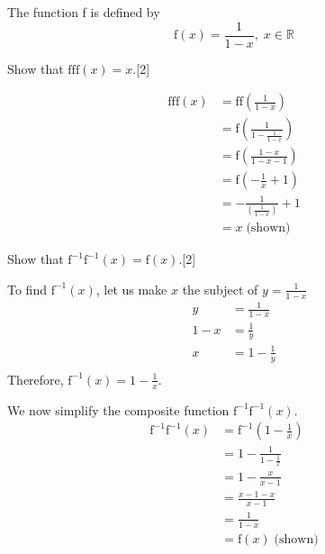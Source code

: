 \documentclass[12pt, a4 paper]{article}
\begin{document}
\begin{outline}[enumerate]
	\1 The function f is defined by \[\textrm{f}(x)=\frac{1}{1-x},\;x\in \mathbb{R}\]
		    
	\2 Show that $\textrm{f}\textrm{f}\textrm{f}(x)=x$.\hfill[2]
	\begin{answer}
		\begin{align*}
			\textrm{f}\textrm{f}\textrm{f}(x) & =\textrm{f}\textrm{f}\left(\frac{1}{1-x}\right)    \\
			                                  & = \textrm{f}\left(\frac{1}{1-\frac{1}{1-x}}\right) \\
			                                  & = \textrm{f}\left(\frac{1-x}{1-x-1}\right)         \\
			                                  & = \textrm{f}\left(-\frac{1}{x}+1\right)            \\
			                                  & = -\frac{1}{(\frac{1}{1-x})}+1                     \\
			                                  & = x\;\textrm{(shown)}                              
		\end{align*}
	\end{answer}
	\2 Show that $\textrm{f}^{-1}\textrm{f}^{-1}(x)=\textrm{f}(x)$.\hfill[2]
	\begin{answer}
		To find $\textrm{f}^{-1}(x)$, let us make $x$ the subject of $y=\frac{1}{1-x}$
		\begin{align*}
			y   & = \frac{1}{1-x}   \\
			1-x & = \frac{1}{y}     \\
			x   & = 1 - \frac{1}{y} \\
		\end{align*}
		Therefore, $\textrm{f}^{-1}(x) = 1 - \frac{1}{x}$.
	\end{answer}     
	\begin{answer}
		We now simplify the composite function $\textrm{f}^{-1}\textrm{f}^{-1}(x).$
		\begin{align*}
			\textrm{f}^{-1}\textrm{f}^{-1}(x) & = \textrm{f}^{-1}(1 - \frac{1}{x}) \\
			                                  & = 1 - \frac{1}{1 - \frac{1}{x}}    \\
			                                  & = 1 - \frac{x}{x-1}                \\
			                                  & = \frac{x-1-x}{x-1}                \\
			                                  & = \frac{1}{1-x}                    \\
			                                  & = \textrm{f}(x)\;\textrm{(shown)}  

\end{align*}
\end{answer}
\end{outline}
\end{document}
